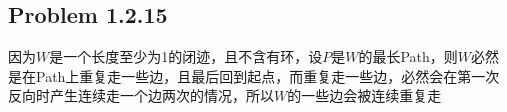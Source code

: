 \subsection*{Problem 1.2.15}
因为$W$是一个长度至少为1的闭迹，且不含有环，设$P$是$W$的最长Path，则$W$必然是在Path上重复走一些边，且最后回到起点，而重复走一些边，必然会在第一次反向时产生连续走一个边两次的情况，所以$W$的一些边会被连续重复走


